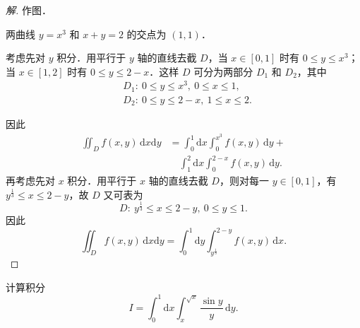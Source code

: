 \begin{proof}[解]
作图．

两曲线 $y=x^{3}$ 和 $x+y=2$ 的交点为 $(1,1)$．

考虑先对 $y$ 积分．用平行于 $y$ 轴的直线去截 $D$，当 $x\in[0,1]$ 时有 $0\leqslant y\leqslant x^{3}$；当 $x\in[1,2]$ 时有 $0\leqslant y\leqslant 2-x$．这样 $D$ 可分为两部分 $D_{1}$ 和 $D_{2}$，其中
\[
\begin{aligned}
&D_{1}:\ 0\leqslant y\leqslant x^{3},\ 0\leqslant x\leqslant 1,\\
&D_{2}:\ 0\leqslant y\leqslant 2-x,\ 1\leqslant x\leqslant 2.
\end{aligned}
\]

\begin{figure}[htbp]
\centering
{}\caption{\relax}\label{fig:20-11}
\end{figure}

因此
\[
\begin{aligned}
\iint_{D}f(x,y)\,\mathrm{d}x\mathrm{d}y&=\int_{0}^{1}\mathrm{d}x\int_{0}^{x^{3}}f(x,y)\,\mathrm{d}y+\\
&\quad \int_{1}^{2}\mathrm{d}x\int_{0}^{2-x}f(x,y)\,\mathrm{d}y.
\end{aligned}
\]
再考虑先对 $x$ 积分．用平行于 $x$ 轴的直线去截 $D$，则对每一 $y\in[0,1]$，有 $y^{\frac{1}{3}}\leqslant x\leqslant 2-y$，故 $D$ 又可表为
\[
D:\ y^{\frac{1}{3}}\leqslant x\leqslant 2-y,\ 0\leqslant y\leqslant 1.
\]
因此
\[
\iint_{D}f(x,y)\,\mathrm{d}x\mathrm{d}y=\int_{0}^{1}\mathrm{d}y\int_{y^{\frac{1}{3}}}^{2-y}f(x,y)\,\mathrm{d}x.
\]
\end{proof}

\begin{example}\label{ex:20-2-5}
计算积分
\[
I=\int_{0}^{1}\mathrm{d}x\int_{x}^{\sqrt{x}}\frac{\sin y}{y}\,\mathrm{d}y.
\]
\end{example}


